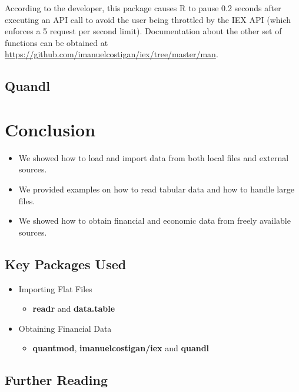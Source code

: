 \documentclass[]{book}
\providecommand{\tightlist}{%
  \setlength{\itemsep}{0pt}\setlength{\parskip}{0pt}}
\theoremstyle{definition}
\theoremstyle{definition}
\theoremstyle{definition}
\theoremstyle{remark}
\begin{document}
According to the developer, this package causes R to pause 0.2 seconds
after executing an API call to avoid the user being throttled by the IEX
API (which enforces a 5 request per second limit). Documentation about
the other set of functions can be obtained at
\url{https://github.com/imanuelcostigan/iex/tree/master/man}.

\subsection{Quandl}\label{quandl}

\section{Conclusion}\label{conclusion}

\begin{itemize}
\tightlist
\item
  We showed how to load and import data from both local files and
  external sources.
\item
  We provided examples on how to read tabular data and how to handle
  large files.
\item
  We showed how to obtain financial and economic data from freely
  available sources.
\end{itemize}

\subsection{Key Packages Used}\label{key-packages-used}

\begin{itemize}
\tightlist
\item
  Importing Flat Files

  \begin{itemize}
  \tightlist
  \item
    \textbf{readr} and \textbf{data.table}
  \end{itemize}
\item
  Obtaining Financial Data

  \begin{itemize}
  \tightlist
  \item
    \textbf{quantmod}, \textbf{imanuelcostigan/iex} and \textbf{quandl}
  \end{itemize}
\end{itemize}

\subsection{Further Reading}\label{further-reading}
\end{document}
